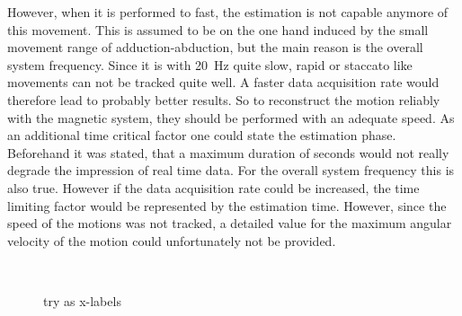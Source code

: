 However,  when it is performed to fast, the estimation is not capable anymore of this movement. This is assumed to be on the one hand induced by the small movement range of adduction-abduction, but the main reason is the overall system frequency. Since it is with \SI{20}{\Hz} quite slow, rapid or staccato like movements can not be tracked quite well. A faster data acquisition rate would therefore lead to probably better results. So to reconstruct the motion reliably with the magnetic system, they should be performed with an adequate speed. As an additional time critical factor one could state the estimation phase. Beforehand it was stated, that a maximum duration of  seconds would not really degrade the impression of real time data. For the overall system frequency this is also true. However if the data acquisition rate could be increased, the time limiting factor would be represented by the estimation time. However, since the speed of the motions was not tracked, a detailed value for the maximum angular velocity of the motion could unfortunately not be provided.\\

\begin{figure}
\centering
{}\\

\caption{try as x-labels}
\end{figure}


 



